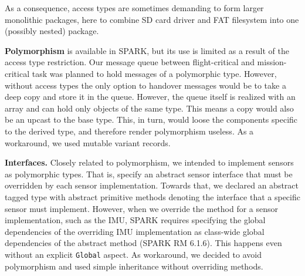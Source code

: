 As a consequence, access types are sometimes demanding
to form larger monolithic packages, here to combine SD card driver and FAT filesystem
into one (possibly nested) package.

\textbf{Polymorphism} is available in SPARK, but its use is
limited as a result of the access type restriction. Our message
queue between flight-critical and mission-critical task was planned to
hold messages of a polymorphic type. However, without access types the
only option to handover messages would be to take a deep copy and
store it in the queue. However, the queue itself 
is realized with an array and can hold only objects of the
same type. This means a copy would also be an upcast to the base
type. This, in turn, would loose the components specific to the derived
type, and therefore render polymorphism useless. As a workaround, we
used mutable variant records.

\textbf{Interfaces.} Closely related to polymorphism, we intended to implement sensors as polymorphic types. That is, specify an abstract sensor interface that must be overridden by each sensor implementation. 
Towards that, we declared an abstract tagged type %
with abstract primitive methods denoting the interface that a specific sensor must implement. %
However, when we override the method for a sensor implementation, such as the IMU, SPARK requires specifying the global dependencies of the overriding IMU implementation as class-wide global dependencies of the abstract %
method (SPARK RM 6.1.6). This happens even without an explicit \texttt{Global} aspect.
%
As workaround, we decided to avoid polymorphism and used simple inheritance without overriding methods.

